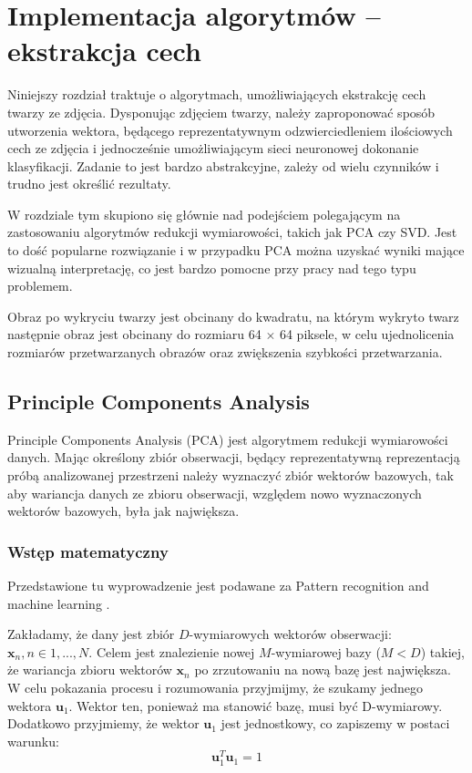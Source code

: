 \documentclass[oneside, eng]{mgr}
\newcommand{\bb}{\textbf}
\begin{document}
\newpage
 
\chapter{Implementacja algorytmów – ekstrakcja cech}

Niniejszy rozdział traktuje o algorytmach, umożliwiających ekstrakcję cech twarzy ze zdjęcia. Dysponując zdjęciem twarzy, należy zaproponować sposób utworzenia wektora, będącego reprezentatywnym odzwierciedleniem ilościowych cech ze zdjęcia i jednocześnie umożliwiającym sieci neuronowej dokonanie klasyfikacji. Zadanie to jest bardzo abstrakcyjne, zależy od wielu czynników i trudno jest określić rezultaty.

W rozdziale tym skupiono się głównie nad podejściem polegającym na zastosowaniu algorytmów redukcji wymiarowości, takich jak PCA czy SVD. Jest to dość popularne rozwiązanie i w przypadku PCA można uzyskać wyniki mające wizualną interpretację, co jest bardzo pomocne przy pracy nad tego typu problemem.

Obraz po wykryciu twarzy jest obcinany do kwadratu, na którym wykryto twarz następnie obraz jest obcinany do rozmiaru 64 $\times$ 64 piksele, w celu ujednolicenia rozmiarów przetwarzanych obrazów oraz zwiększenia szybkości przetwarzania.
 
\section{Principle Components Analysis}

Principle Components Analysis (PCA) jest algorytmem redukcji wymiarowości danych. Mając określony zbiór obserwacji, będący reprezentatywną reprezentacją próbą analizowanej przestrzeni należy wyznaczyć zbiór wektorów bazowych, tak aby wariancja danych ze zbioru obserwacji, względem nowo wyznaczonych wektorów bazowych, była jak największa.

\subsection{Wstęp matematyczny}

Przedstawione tu wyprowadzenie jest podawane za Pattern recognition and machine learning \cite{Pattern recognition}.

Zakładamy, że dany jest zbiór $D$-wymiarowych wektorów obserwacji: $\bb{x}_n , n \in 1,...,N $. Celem jest znalezienie nowej $M$-wymiarowej bazy ($M < D$) takiej, że wariancja zbioru wektorów $\bb{x}_n$ po zrzutowaniu na nową bazę jest największa. W celu pokazania procesu i rozumowania przyjmijmy, że szukamy jednego wektora $\bb{u}_1$. Wektor ten, ponieważ ma stanowić bazę, musi być D-wymiarowy. Dodatkowo przyjmiemy, że wektor $\bb{u}_1$ jest jednostkowy, co zapiszemy w postaci warunku:
\begin{equation} \label{eq:wektor_jednostkowy}
	\bb{u}_1^{T}\bb{u}_1 = 1
\end{equation}
\end{document}
